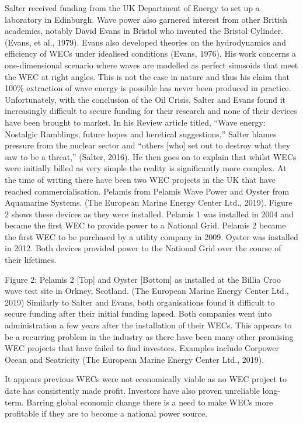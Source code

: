 \documentclass{report}
\begin{document}
Salter received funding from the UK Department of Energy to set up a laboratory in Edinburgh. Wave power also garnered interest from other British academics, notably David Evans in Bristol who invented the Bristol Cylinder. (Evans, et al., 1979).
Evans also developed theories on the hydrodynamics and efficiency of WECs under idealised conditions (Evans, 1976). His work concerns a one-dimensional scenario where waves are modelled as perfect sinusoids that meet the WEC at right angles. This is not the case in nature and thus his claim that 100\% extraction of wave energy is possible has never been produced in practice.
Unfortunately, with the conclusion of the Oil Crisis, Salter and Evans found it increasingly difficult to secure funding for their research and none of their devices have been brought to market. In his Review article titled, ``Wave energy: Nostalgic Ramblings, future hopes and heretical suggestions,'' Salter blames pressure from the nuclear sector and ``others [who] set out to destroy what they saw to be a threat,'' (Salter, 2016). He then goes on to explain that whilst WECs were initially billed as very simple the reality is significantly more complex.
At the time of writing there have been two WEC projects in the UK that have reached commercialisation. Pelamis from Pelamis Wave Power and Oyster from Aquamarine Systems. (The European Marine Energy Center Ltd., 2019). Figure 2 shows these devices as they were installed. Pelamis 1 was installed in 2004 and became the first WEC to provide power to a National Grid. Pelamis 2 became the first WEC to be purchased by a utility company in 2009. Oyster was installed in 2012. Both devices provided power to the National Grid over the course of their lifetimes.

  
Figure 2: Pelamis 2 [Top] and Oyster [Bottom] as installed at the Billia Croo wave test site in Orkney, Scotland. (The European Marine Energy Center Ltd., 2019)
Similarly to Salter and Evans, both organisations found it difficult to secure funding after their initial funding lapsed. Both companies went into administration a few years after the installation of their WECs. This appears to be a recurring problem in the industry as there have been many other promising WEC projects that have failed to find investors. Examples include Corpower Ocean and Seatricity (The European Marine Energy Center Ltd., 2019).

It appears previous WECs were not economically viable as no WEC project to date has consistently made profit. Investors have also proven unreliable long-term. Barring global economic change there is a need to make WECs more profitable if they are to become a national power source.
\end{document}

